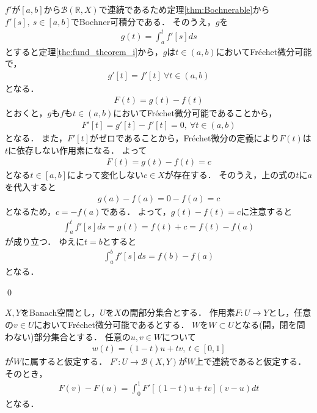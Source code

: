 \begin{Proof}
	$f'$が$[a, b]$から${\mathcal B}({\mathbb R},X)$で連続であるため定理\ref{thm:Bochnerable}から$f'[s], ~ s \in [a, b]$でBochner可積分である．
	そのうえ，$g$を
	\begin{align*}
		g(t) = \int_{a}^{t} f'[s] ds
	\end{align*}
	とすると定理\ref{the:fund_theorem_i}から，$g$は$t \in (a, b)$においてFr\'echet微分可能で，
	\begin{align*}
		g'[t] = f'[t]  ~ \forall t \in (a, b)
	\end{align*}	
	となる．
	\begin{align*}
		F(t) = g(t) - f(t)
	\end{align*}	
	とおくと，$g$も$f$も$t \in (a, b)$においてFr\'echet微分可能であることから，
	\begin{align*}
		F'[t] = g'[t] - f'[t] = 0, ~ \forall t \in (a, b)
	\end{align*}	
	となる．
	また，$F'[t]$がゼロであることから，Fr\'echet微分の定義により$F(t)$は$t$に依存しない作用素になる．
	よって
	\begin{align*}
		F(t) = g(t) - f(t) = c
	\end{align*}	
	となる$t \in [a, b]$によって変化しない$c \in X$が存在する．
	そのうえ，上の式の$t$に$a$を代入すると
	\begin{align*}
		g(a) - f(a) = 0 - f(a) = c
	\end{align*}	
	となるため，$c = -f(a)$である．
	よって，$g(t) - f(t) = c$に注意すると
	\begin{align*}
		\int_{a}^{t} f'[s] ds = g(t) = f(t) + c = f(t) - f(a)
	\end{align*}	
	が成り立つ．
	ゆえに$t = b$とすると
	\begin{align*}
		\int_{a}^{b} f'[s] ds = f(b) - f(a)
	\end{align*}	
	となる．

\qed
\end{Proof}

\begin{Thm}\label{thm:fundamental_theorem_of_calculus}
$X, Y$をBanach空間とし，$U$を$X$の開部分集合とする．
作用素$F:U \rightarrow Y$とし，任意の$v \in U$においてFr\'echet微分可能であるとする．
$W$を$W \subset U$となる(開，閉を問わない)部分集合とする．
任意の$u, v \in W$について
\begin{align*}
	w(t) = (1 - t) u + t v, ~ t \in [0,1]
\end{align*}
が$W$に属すると仮定する．
$F': U \rightarrow {\mathcal B}(X,Y)$が$W$上で連続であると仮定する．
そのとき，
\begin{align*}
	F(v)  - F(u) = \int_0^1 F'[(1 - t) u + t v](v - u)dt
\end{align*}
となる．
\end{Thm}

